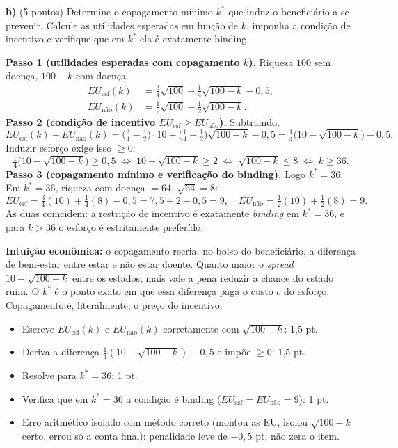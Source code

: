 \textbf{b)} (5 pontos) Determine o copagamento m\'inimo $k^*$ que induz o benefici\'ario a se prevenir. Calcule as utilidades esperadas em fun\c{c}\~ao de $k$, imponha a condi\c{c}\~ao de incentivo e verifique que em $k^*$ ela \'e exatamente binding.
\resolucaobox{7.6cm}
\begin{solucao}
\textbf{Passo 1 (utilidades esperadas com copagamento $k$).} Riqueza $100$ sem doen\c{c}a, $100-k$ com doen\c{c}a.
\begin{align*}
EU_{\text{esf}}(k) &= \tfrac{3}{4}\sqrt{100} + \tfrac{1}{4}\sqrt{100-k} - 0{,}5,\\
EU_{\text{n\~ao}}(k) &= \tfrac{1}{2}\sqrt{100} + \tfrac{1}{2}\sqrt{100-k}.
\end{align*}
\textbf{Passo 2 (condi\c{c}\~ao de incentivo $EU_{\text{esf}} \ge EU_{\text{n\~ao}}$).} Subtraindo,
\[
EU_{\text{esf}}(k) - EU_{\text{n\~ao}}(k) = \Big(\tfrac{3}{4}-\tfrac{1}{2}\Big)\cdot 10 + \Big(\tfrac{1}{4}-\tfrac{1}{2}\Big)\sqrt{100-k} - 0{,}5 = \tfrac{1}{4}\big(10 - \sqrt{100-k}\big) - 0{,}5.
\]
Induzir esfor\c{c}o exige isso $\ge 0$:
\[
\tfrac{1}{4}\big(10 - \sqrt{100-k}\big) \ge 0{,}5 \;\Longleftrightarrow\; 10 - \sqrt{100-k} \ge 2 \;\Longleftrightarrow\; \sqrt{100-k} \le 8 \;\Longleftrightarrow\; k \ge 36.
\]
\textbf{Passo 3 (copagamento m\'inimo e verifica\c{c}\~ao do binding).} Logo $k^* = 36$. Em $k^*=36$, riqueza com doen\c{c}a $=64$, $\sqrt{64}=8$:
\[
EU_{\text{esf}} = \tfrac{3}{4}(10)+\tfrac{1}{4}(8) - 0{,}5 = 7{,}5 + 2 - 0{,}5 = 9, \quad EU_{\text{n\~ao}} = \tfrac{1}{2}(10)+\tfrac{1}{2}(8) = 9.
\]
As duas coincidem: a restri\c{c}\~ao de incentivo \'e exatamente \emph{binding} em $k^*=36$, e para $k>36$ o esfor\c{c}o \'e estritamente prefer\'ido.

\textbf{Intui\c{c}\~ao econ\^omica:} o copagamento recria, no bolso do benefici\'ario, a diferen\c{c}a de bem-estar entre estar e n\~ao estar doente. Quanto maior o \emph{spread} $10-\sqrt{100-k}$ entre os estados, mais vale a pena reduzir a chance do estado ruim. O $k^*$ \'e o ponto exato em que essa diferen\c{c}a paga o custo $c$ do esfor\c{c}o. Copagamento \'e, literalmente, o pre\c{c}o do incentivo.
\rubricalabel
\begin{itemize}
\item Escreve $EU_{\text{esf}}(k)$ e $EU_{\text{n\~ao}}(k)$ corretamente com $\sqrt{100-k}$: 1{,}5 pt.
\item Deriva a diferen\c{c}a $\tfrac{1}{4}(10-\sqrt{100-k}) - 0{,}5$ e imp\~oe $\ge 0$: 1{,}5 pt.
\item Resolve para $k^* = 36$: 1 pt.
\item Verifica que em $k^*=36$ a condi\c{c}\~ao \'e binding ($EU_{\text{esf}}=EU_{\text{n\~ao}}=9$): 1 pt.
\item Erro aritm\'etico isolado com m\'etodo correto (montou as EU, isolou $\sqrt{100-k}$ certo, errou s\'o a conta final): penalidade leve de $-0{,}5$ pt, n\~ao zera o item.
\end{itemize}
\end{solucao}

